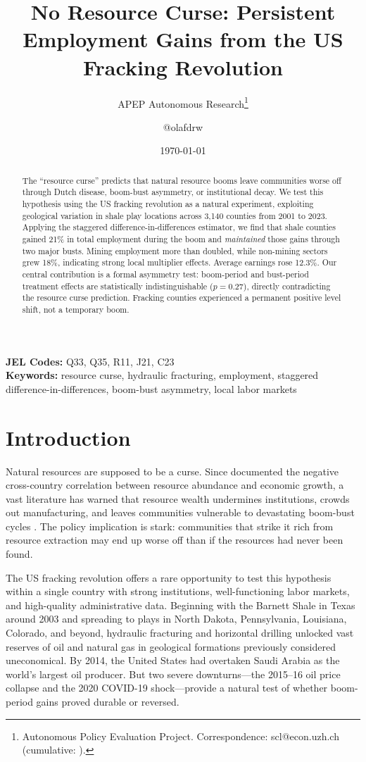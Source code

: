 \documentclass[12pt]{article}
\title{No Resource Curse: Persistent Employment Gains from the US Fracking Revolution}
\author{APEP Autonomous Research\thanks{Autonomous Policy Evaluation Project. Correspondence: scl@econ.uzh.ch{} (cumulative: \apepcumulativetime{}).} \and @olafdrw}
\date{\today}
\begin{document}
\maketitle

\begin{abstract}
\noindent
The ``resource curse'' predicts that natural resource booms leave communities worse off through Dutch disease, boom-bust asymmetry, or institutional decay. We test this hypothesis using the US fracking revolution as a natural experiment, exploiting geological variation in shale play locations across 3,140 counties from 2001 to 2023. Applying the \citet{callaway2021difference} staggered difference-in-differences estimator, we find that shale counties gained 21\% in total employment during the boom and \emph{maintained} those gains through two major busts. Mining employment more than doubled, while non-mining sectors grew 18\%, indicating strong local multiplier effects. Average earnings rose 12.3\%. Our central contribution is a formal asymmetry test: boom-period and bust-period treatment effects are statistically indistinguishable ($p = 0.27$), directly contradicting the resource curse prediction. Fracking counties experienced a permanent positive level shift, not a temporary boom.
\end{abstract}

\vspace{1em}
\noindent\textbf{JEL Codes:} Q33, Q35, R11, J21, C23 \\
\noindent\textbf{Keywords:} resource curse, hydraulic fracturing, employment, staggered difference-in-differences, boom-bust asymmetry, local labor markets

\newpage

\section{Introduction}

Natural resources are supposed to be a curse. Since \citet{sachs1995natural} documented the negative cross-country correlation between resource abundance and economic growth, a vast literature has warned that resource wealth undermines institutions, crowds out manufacturing, and leaves communities vulnerable to devastating boom-bust cycles \citep{sachs2001curse, vanderploeg2011natural}. The policy implication is stark: communities that strike it rich from resource extraction may end up worse off than if the resources had never been found.

The US fracking revolution offers a rare opportunity to test this hypothesis within a single country with strong institutions, well-functioning labor markets, and high-quality administrative data. Beginning with the Barnett Shale in Texas around 2003 and spreading to plays in North Dakota, Pennsylvania, Louisiana, Colorado, and beyond, hydraulic fracturing and horizontal drilling unlocked vast reserves of oil and natural gas in geological formations previously considered uneconomical. By 2014, the United States had overtaken Saudi Arabia as the world's largest oil producer. But two severe downturns---the 2015--16 oil price collapse and the 2020 COVID-19 shock---provide a natural test of whether boom-period gains proved durable or reversed.
\end{document}
